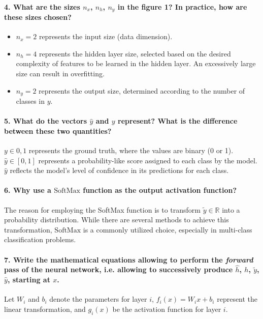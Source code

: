 \documentclass{article}
\theoremstyle{plain}%
\theoremstyle{definition}
\theoremstyle{remark}
\begin{document}
\paragraph{4. What are the sizes $n_x$, $n_h$, $n_y$ in the figure 1? In practice, how are these sizes chosen?}
\begin{itemize}
    \item $n_x = 2$ represents the input size (data dimension).
    \item $n_h = 4$ represents the hidden layer size, selected based on the desired complexity of features to be learned in the hidden layer. An excessively large size can result in overfitting.
    \item $n_y = 2$ represents the output size, determined according to the number of classes in $y$.
\end{itemize}

\paragraph{5. What do the vectors $\hat{y}$ and $y$ represent? What is the difference between these two quantities?}
$y \in {0,1}$ represents the ground truth, where the values are binary (0 or 1).
$\hat{y} \in [0,1]$ represents a probability-like score assigned to each class by the model. $\hat{y}$ reflects the model's level of confidence in its predictions for each class.

\paragraph{6. Why use a $\text{SoftMax}$ function as the output activation function?}
The reason for employing the SoftMax function is to transform $\tilde{y} \in \mathbb{R}$ into a probability distribution. While there are several methods to achieve this transformation, $\text{SoftMax}$ is a commonly utilized choice, especially in multi-class classification problems.

\paragraph{7. Write the mathematical equations allowing to perform the \textit{forward} pass of the neural network, i.e. allowing to successively produce $\hat{h}$, $ h $, $ \tilde{y} $, $ \hat{y} $, starting at $x$.}
Let $W_i$ and $b_i$ denote the parameters for layer $i$, $f_i(x) = W_i x + b_i$ represent the linear transformation, and $g_i(x)$ be the activation function for layer $i$.
\end{document}
